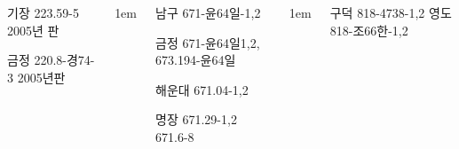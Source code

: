 \documentclass[	20pt, 
							a1paper, 
							portrait, %
							margin=0mm, %
							innermargin=10mm,  		%
							blockverticalspace=4mm, %
							colspace=5mm, 
							subcolspace=0mm
							]{tikzposter}
\begin{document}
\begin{columns}
{\begin{LARGE}
기장  223.59-5         2005년 판

금정  220.8-경74-3  2005년판
				\end{LARGE}
			}


			{
					\setlength{\leftmargini}{7em}
					\setlength{\labelsep} {1em}
				\begin{LARGE}
남구 671-윤64일-1,2

금정 671-윤64일1,2,  673.194-윤64일

해운대  671.04-1,2    

명장    671.29-1,2   671.6-8
				\end{LARGE}
			}



			{
					\setlength{\leftmargini}{7em}
					\setlength{\labelsep} {1em}
				\begin{LARGE}
구덕    818-4738-1,2   	%
영도    818-조66한-1,2 	%

				\end{LARGE}
			}



\end{columns}
\end{document}
